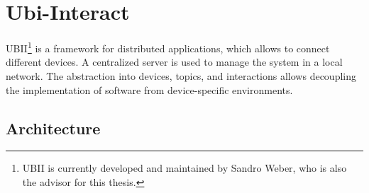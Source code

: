 \section{Ubi-Interact}\label{section:ubi-interact}
\setcounter{footnote}{0} %

\ac{UBII}\footnote{UBII is currently developed and maintained by Sandro Weber, who is also the advisor for this thesis.} is a framework for distributed applications, which allows to connect different devices. A centralized server is used to manage the system in a local network. The abstraction into devices, topics, and interactions allows decoupling the implementation of software from device-specific environments.


\subsection{Architecture}\label{subsection:architecture}

